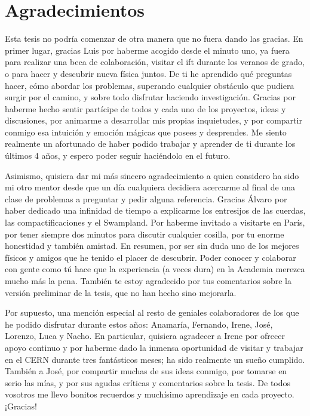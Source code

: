 \thispagestyle{empty}
\chapter*{Agradecimientos}

Esta tesis no podría comenzar de otra manera que no fuera dando las gracias. En primer lugar, gracias Luis por haberme acogido desde el minuto uno, ya fuera para realizar una beca de colaboración, visitar el ift durante los veranos de grado, o para hacer y descubrir nueva física juntos. De ti he aprendido qué preguntas hacer, cómo abordar los problemas, superando cualquier obstáculo que pudiera surgir por el camino, y sobre todo disfrutar haciendo investigación. Gracias por haberme hecho sentir partícipe de todos y cada uno de los proyectos, ideas y discusiones, por animarme a desarrollar mis propias inquietudes, y por compartir conmigo esa intuición y emoción mágicas que posees y desprendes. Me siento realmente un afortunado de haber podido trabajar y aprender de ti durante los últimos 4 años, y espero poder seguir haciéndolo en el futuro.

Asimismo, quisiera dar mi más sincero agradecimiento a quien considero ha sido mi otro mentor desde que un día cualquiera decidiera acercarme al final de una clase de problemas a preguntar y pedir alguna referencia. Gracias Álvaro por haber dedicado una infinidad de tiempo a explicarme los entresijos de las cuerdas, las compactificaciones y el Swampland. Por haberme invitado a visitarte en París, por tener siempre dos minutos para discutir cualquier cosilla, por tu enorme honestidad y también amistad. En resumen, por ser sin duda uno de los mejores físicos y amigos que he tenido el placer de descubrir. Poder conocer y colaborar con gente como tú hace que la experiencia (a veces dura) en la Academia merezca mucho más la pena. También te estoy agradecido por tus comentarios sobre la versión preliminar de la tesis, que no han hecho sino mejorarla.

Por supuesto, una mención especial al resto de geniales colaboradores de los que he podido disfrutar durante estos años: Anamaría, Fernando, Irene, José, Lorenzo, Luca y Nacho. En particular, quisiera agradecer a Irene por ofrecer apoyo continuo y por haberme dado la inmensa oportunidad de visitar y trabajar en el CERN durante tres fantásticos meses; ha sido realmente un sueño cumplido. También a José, por compartir muchas de sus ideas conmigo, por tomarse en serio las mías, y por sus agudas críticas y comentarios sobre la tesis. De todos vosotros me llevo bonitos recuerdos y muchísimo aprendizaje en cada proyecto. ¡Gracias!

